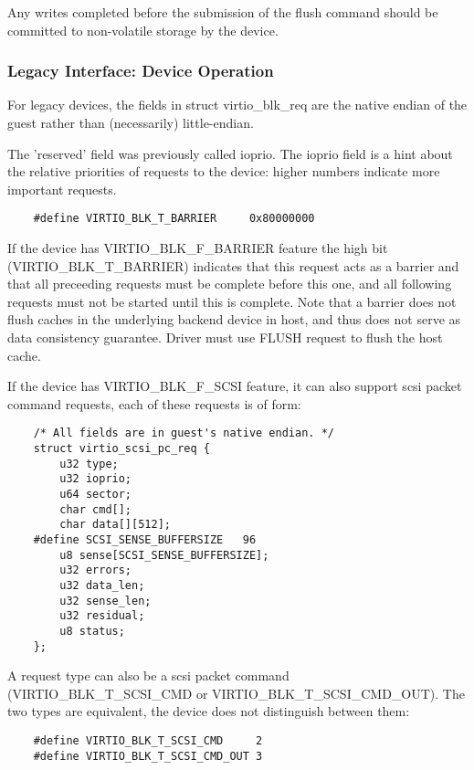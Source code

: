 Any writes completed before the submission of the flush command should
be committed to non-volatile storage by the device.

\subsubsection{Legacy Interface: Device Operation}\label{sec:Device Types / Block Device / Device Operation / Legacy Interface: Device Operation}
For legacy devices, the fields in struct virtio_blk_req are the
native endian of the guest rather than (necessarily) little-endian.

The 'reserved' field was previously called ioprio.  The ioprio field
is a hint about the relative priorities of requests to the device:
higher numbers indicate more important requests.

\begin{lstlisting}
	#define VIRTIO_BLK_T_BARRIER	 0x80000000
\end{lstlisting}

If the device has VIRTIO_BLK_F_BARRIER
feature the high bit (VIRTIO_BLK_T_BARRIER) indicates that this
request acts as a barrier and that all preceeding requests must be
complete before this one, and all following requests must not be
started until this is complete. Note that a barrier does not flush
caches in the underlying backend device in host, and thus does not
serve as data consistency guarantee. Driver must use FLUSH request to
flush the host cache.

If the device has VIRTIO_BLK_F_SCSI feature, it can also support
scsi packet command requests, each of these requests is of form:

\begin{lstlisting}
	/* All fields are in guest's native endian. */
	struct virtio_scsi_pc_req {
		u32 type;
		u32 ioprio;
		u64 sector;
		char cmd[];
		char data[][512];
	#define SCSI_SENSE_BUFFERSIZE   96
		u8 sense[SCSI_SENSE_BUFFERSIZE];
		u32 errors;
		u32 data_len;
		u32 sense_len;
		u32 residual;
		u8 status;
	};
\end{lstlisting}

A request type can also be a scsi packet command (VIRTIO_BLK_T_SCSI_CMD or
VIRTIO_BLK_T_SCSI_CMD_OUT).  The two types are equivalent, the device
does not distinguish between them:

\begin{lstlisting}
	#define VIRTIO_BLK_T_SCSI_CMD     2
	#define VIRTIO_BLK_T_SCSI_CMD_OUT 3
\end{lstlisting}

